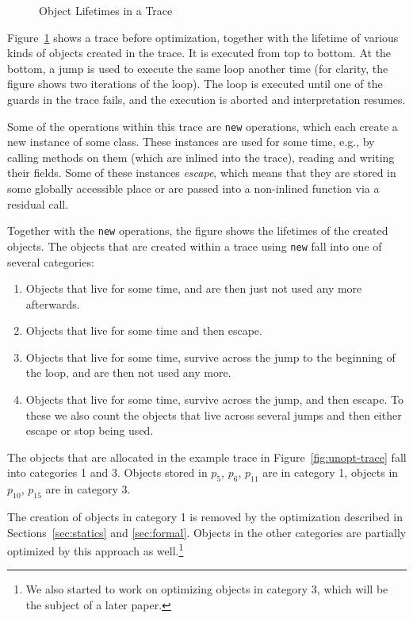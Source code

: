 \documentclass{sigplanconf}
\newcommand\eg{e.g.,\xspace}
\begin{document}
\begin{figure}
\caption{Object Lifetimes in a Trace}
\label{fig:lifetimes}
\end{figure}

Figure~\ref{fig:lifetimes} shows a trace before optimization, together with the
lifetime of various kinds of objects created in the trace. It is executed from
top to bottom. At the bottom, a jump is used to execute the same loop another
time (for clarity, the figure shows two iterations of the loop). The loop is
executed until one of the guards in the trace fails, and the execution is
aborted and interpretation resumes.

Some of the operations within this trace are \lstinline{new} operations, which each
create a new instance of some class. These instances are used for some time, \eg
by calling methods on them (which are inlined into the trace), reading and
writing their fields. Some of these instances \emph{escape}, which means that
they are stored in some globally accessible place or are passed into a
non-inlined function via a residual call.

Together with the \lstinline{new} operations, the figure shows the lifetimes of the
created objects. The objects that are created within a trace using \lstinline{new}
fall into one of several categories:

\begin{enumerate}
    \item Objects that live for some time, and are then just not
    used any more afterwards.

    \item Objects that live for some time and then escape.

    \item Objects that live for some time, survive across the jump to
    the beginning of the loop, and are then not used any more.

    \item Objects that live for some time, survive across the jump,
    and then escape. To these we also count the objects that live across several
    jumps and then either escape or stop being used.
\end{enumerate}

The objects that are allocated in the example trace in
Figure~\ref{fig:unopt-trace} fall into categories 1 and 3. Objects stored in
$p_{5}$, $p_{6}$, $p_{11}$ are in category 1, objects in $p_{10}$, $p_{15}$ are in
category 3.

The creation of objects in category 1 is removed by the optimization described
in Sections~\ref{sec:statics} and \ref{sec:formal}. Objects in the other
categories are partially optimized by this approach as well.\footnote{We also started to
work on optimizing objects in category 3, which will be the subject of a later
paper.}
\end{document}

